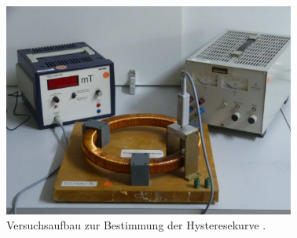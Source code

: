 \begin{figure}[H]
    \centering
    \includegraphics[height = 7cm]{abbildungen/toroidspule mit kern.png}
    \caption{Versuchsaufbau zur Bestimmung der Hysteresekurve \cite[]{man:v308}.}
    \label{fig:hysterese_aufbau}
\end{figure}

